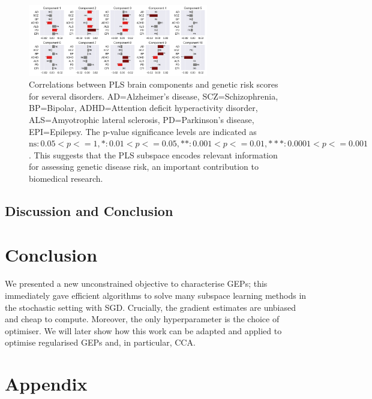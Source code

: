 \begin{figure}
    \centering
    \includegraphics[width=0.7\textwidth,trim={0.5cm 0cm 0.7cm 0cm}]{figures/gradient_descent/UKBB/prs_correlations}
    \caption{Correlations between PLS brain components and genetic risk scores for several disorders. AD=Alzheimer's disease, SCZ=Schizophrenia, BP=Bipolar, ADHD=Attention deficit hyperactivity disorder, ALS=Amyotrophic lateral sclerosis, PD=Parkinson's disease, EPI=Epilepsy. The p-value significance levels are indicated as $\text{ns}: 0.05< p <= 1, \ast: 0.01< p <=0.05, \ast\ast: 0.001< p <= 0.01, \ast\ast\ast: 0.0001< p <= 0.001$. This suggests that the PLS subspace encodes relevant information for assessing genetic disease risk, an important contribution to biomedical research.}
    \label{fig:genetic_risk}
\end{figure}


\subsection{Discussion and Conclusion}

\section{Conclusion}

We presented a new unconstrained objective to characterise GEPs; this immediately gave efficient algorithms to solve many subspace learning methods in the stochastic setting with SGD.
Crucially, the gradient estimates are unbiased and cheap to compute.
Moreover, the only hyperparameter is the choice of optimiser.
We will later show how this work can be adapted and applied to optimise regularised GEPs and, in particular, CCA.

\appendix

\section{Appendix}